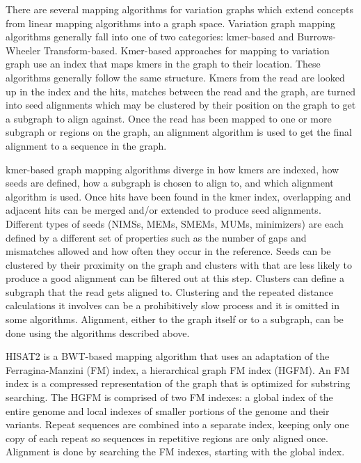 There are several mapping algorithms for variation graphs which extend concepts from linear mapping algorithms into a graph space.
Variation graph mapping algorithms generally fall into one of two categories: kmer-based and Burrows-Wheeler Transform-based.
Kmer-based approaches for mapping to variation graph use an index that maps kmers in the graph to their location.
These algorithms generally follow the same structure.
Kmers from the read are looked up in the index and the hits, matches between the read and the graph, are turned into seed alignments which may be clustered by their position on the graph to get a subgraph to align against.
Once the read has been mapped to one or more subgraph or regions on the graph, an alignment algorithm is used to get the final alignment to a sequence in the graph.

kmer-based graph mapping algorithms diverge in how kmers are indexed, how seeds are defined, how a subgraph is chosen to align to, and which alignment algorithm is used.
Once hits have been found in the kmer index, overlapping and adjacent hits can be merged and/or extended to produce seed alignments.
Different types of seeds (NIMSs, MEMs, SMEMs, MUMs, minimizers) are each defined by a different set of properties such as the number of gaps and mismatches allowed and how often they occur in the reference.
Seeds can be clustered by their proximity on the graph and clusters with that are less likely to produce a good alignment can be filtered out at this step.
Clusters can define a subgraph that the read gets aligned to.
Clustering and the repeated distance calculations it involves can be a prohibitively slow process and it is omitted in some algorithms.
Alignment, either to the graph itself or to a subgraph, can be done using the algorithms described above.

HISAT2 is a BWT-based mapping algorithm that uses an adaptation of the Ferragina-Manzini (FM) index, a hierarchical graph FM index (HGFM).
An FM index is a compressed representation of the graph that is optimized for substring searching.
The HGFM is comprised of two FM indexes: a global index of the entire genome and local indexes of smaller portions of the genome and their variants.
Repeat sequences are combined into a separate index, keeping only one copy of each repeat so sequences in repetitive regions are only aligned once.
Alignment is done by searching the FM indexes, starting with the global index.


